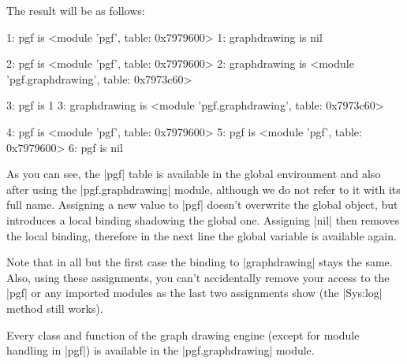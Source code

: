The result will be as follows:

\begin{codeexample}
1: pgf is <module 'pgf', table: 0x7979600>
1: graphdrawing is nil

2: pgf is <module 'pgf', table: 0x7979600>
2: graphdrawing is <module 'pgf.graphdrawing', table: 0x7973c60>

3: pgf is 1
3: graphdrawing is <module 'pgf.graphdrawing', table: 0x7973c60>

4: pgf is <module 'pgf', table: 0x7979600>
5: pgf is <module 'pgf', table: 0x7979600>
6: pgf is nil
\end{codeexample}

As you can see, the |pgf| table is available in the global environment
and also after using the |pgf.graphdrawing| module, although we do not 
refer to it with its full name.  Assigning a new value to |pgf|
doesn't overwrite the global object, but introduces a local binding
shadowing the global one. Assigning |nil| then removes the local
binding, therefore in the next line the global variable is available
again.

Note that in all but the first case the binding to |graphdrawing|
stays the same.  Also, using these assignments, you can't accidentally
remove your access to the |pgf| or any imported modules as the last
two assignments show (the |Sys:log| method still works).

Every class and function of the graph drawing engine (except for
module handling in |pgf|) is available in the |pgf.graphdrawing|
module. 



